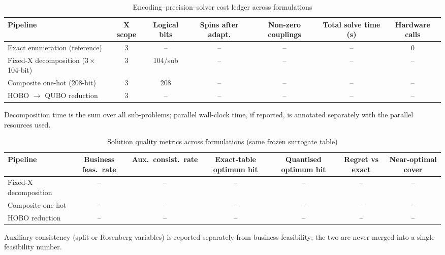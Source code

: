 \begin{table}[htbp]
  \centering
  \caption{Encoding--precision--solver cost ledger across formulations}
  \label{tab:cost_ledger}
  \begin{tabular}{lcccccc}
    \toprule
    Pipeline & X scope & Logical bits & Spins after adapt. & Non-zero couplings & Total solve time (s) & Hardware calls \\
    \midrule
    Exact enumeration (reference) & 3 & --  & -- & -- & -- & 0 \\
    Fixed-X decomposition ($3\times$104-bit) & 3 & 104/sub & -- & -- & -- & -- \\
    Composite one-hot (208-bit)    & 3 & 208 & -- & -- & -- & -- \\
    HOBO $\rightarrow$ QUBO reduction & 3 & -- & -- & -- & -- & -- \\
    \bottomrule
  \end{tabular}
  \begin{minipage}{\linewidth}\vspace{2pt}\footnotesize
    Decomposition time is the sum over all sub-problems; parallel wall-clock time,
    if reported, is annotated separately with the parallel resources used.
  \end{minipage}
\end{table}

\begin{table}[htbp]
  \centering
  \caption{Solution quality metrics across formulations (same frozen surrogate table)}
  \label{tab:quality_ledger}
  \begin{tabular}{lcccccc}
    \toprule
    Pipeline & Business feas.\ rate & Aux.\ consist.\ rate & Exact-table optimum hit & Quantised optimum hit & Regret vs exact & Near-optimal cover \\
    \midrule
    Fixed-X decomposition & -- & -- & -- & -- & -- & -- \\
    Composite one-hot     & -- & -- & -- & -- & -- & -- \\
    HOBO reduction        & -- & -- & -- & -- & -- & -- \\
    \bottomrule
  \end{tabular}
  \begin{minipage}{\linewidth}\vspace{2pt}\footnotesize
    Auxiliary consistency (split or Rosenberg variables) is reported separately from
    business feasibility; the two are never merged into a single feasibility number.
  \end{minipage}
\end{table}


